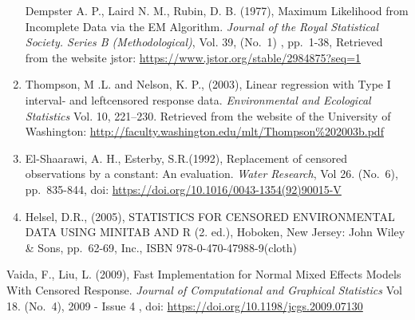\documentclass[]{article}
\begin{document}
\begin{enumerate}
  Dempster A. P., Laird N. M., Rubin, D. B. (1977), Maximum Likelihood
  from Incomplete Data via the EM Algorithm. \emph{Journal of the Royal
  Statistical Society. Series B (Methodological)}, Vol. 39, (No.~1) ,
  pp.~1-38, Retrieved from the website jstor:
  \url{https://www.jstor.org/stable/2984875?seq=1}
\item
  Thompson, M .L. and Nelson, K. P., (2003), Linear regression with Type
  I interval- and leftcensored response data. \emph{Environmental and
  Ecological Statistics} Vol. 10, 221--230. Retrieved from the website
  of the University of Washington:
  \url{http://faculty.washington.edu/mlt/Thompson\%202003b.pdf}
\item
  El-Shaarawi, A. H., Esterby, S.R.(1992), Replacement of censored
  observations by a constant: An evaluation. \emph{Water Research}, Vol
  26. (No.~6), pp.~835-844, doi:
  \url{https://doi.org/10.1016/0043-1354(92)90015-V}
\item
  Helsel, D.R., (2005), STATISTICS FOR CENSORED ENVIRONMENTAL DATA USING
  MINITAB AND R (2. ed.), Hoboken, New Jersey: John Wiley \& Sons,
  pp.~62-69, Inc., ISBN 978-0-470-47988-9(cloth)
\end{enumerate}

Vaida, F., Liu, L. (2009), Fast Implementation for Normal Mixed Effects
Models With Censored Response. \emph{Journal of Computational and
Graphical Statistics} Vol 18. (No.~4), 2009 - Issue 4 , doi:
\url{https://doi.org/10.1198/jcgs.2009.07130}
\end{document}

